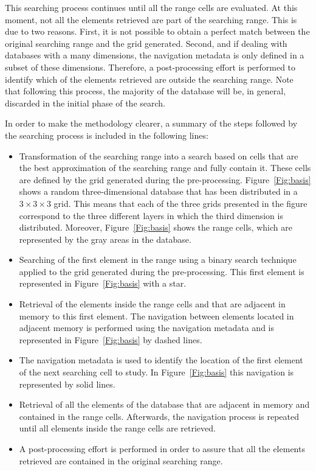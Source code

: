 \documentclass[review]{elsarticle}
\begin{document}
This searching process continues until all the range cells are evaluated. At this moment, not all the elements retrieved are part of the searching range. This is due to two reasons. First, it is not possible to obtain a perfect match between the original searching range and the grid generated. Second, and if dealing with databases with a many dimensions, the navigation metadata is only defined in a subset of these dimensions. Therefore, a post-processing effort is performed to identify which of the elements retrieved are outside the searching range. Note that following this process, the majority of the database will be, in general, discarded in the initial phase of the search.

In order to make the methodology clearer, a summary of the steps followed by the searching process is included in the following lines:
\begin{itemize}
  \item Transformation of the searching range into a search based on cells that are the best approximation of the searching range and fully contain it. These cells are defined by the grid generated during the pre-processing. Figure~\ref{Fig:basis} shows a random three-dimensional database that has been distributed in a $3\times3\times3$ grid. This means that each of the three grids presented in the figure correspond to the three different layers in which the third dimension is distributed. Moreover, Figure~\ref{Fig:basis} shows the range cells, which are represented by the gray areas in the database.
  \item Searching of the first element in the range using a binary search technique applied to the grid generated during the pre-processing. This first element is represented in Figure~\ref{Fig:basis} with a star.
  \item Retrieval of the elements inside the range cells and that are adjacent in memory to this first element. The navigation between elements located in adjacent memory is performed using the navigation metadata and is represented in Figure~\ref{Fig:basis} by dashed lines.
  \item The navigation metadata is used to identify the location of the first element of the next searching cell to study. In Figure~\ref{Fig:basis} this navigation is represented by solid lines.
  \item Retrieval of all the elements of the database that are adjacent in memory and contained in the range cells. Afterwards, the navigation process is repeated until all elements inside the range cells are retrieved.
  \item A post-processing effort is performed in order to assure that all the elements retrieved are contained in the original searching range.
\end{itemize}
\end{document}
